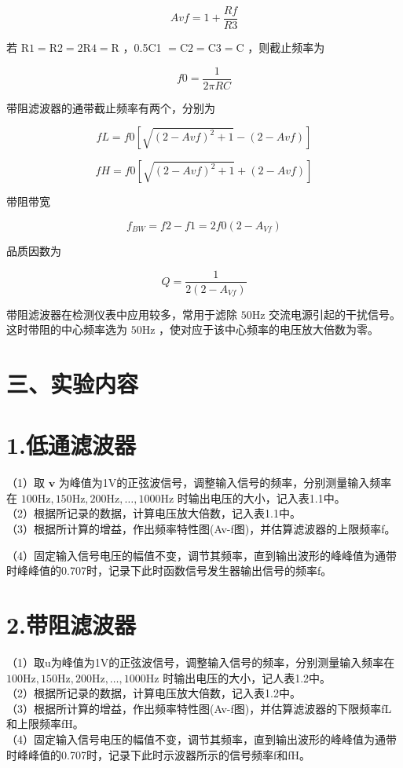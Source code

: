 \documentclass[
  10
]{article}
\begin{document}
\[
A v f = 1 + \frac {R f}{R 3}
\]

若 \(\mathrm{R1 = R2 = 2R4 = R}\) ，0.5C1
\(= \mathrm{C2} = \mathrm{C3} = \mathrm{C}\) ，则截止频率为

\[
f 0 = \frac {1}{2 \pi R C}
\]

带阻滤波器的通带截止频率有两个，分别为

\[
f L = f 0 [ \sqrt {(2 - A v f) ^ {2} + 1} - (2 - A v f) ]
\]

\[
f H = f 0 [ \sqrt {(2 - A v f) ^ {2} + 1} + (2 - A v f) ]
\]

带阻带宽

\[
f _ {B W} = f 2 - f 1 = 2 f 0 \left(2 - A _ {V f}\right)
\]

品质因数为

\[
Q = \frac {1}{2 (2 - A _ {V f})}
\]

带阻滤波器在检测仪表中应用较多，常用于滤除 \(50\mathrm{Hz}\)
交流电源引起的干扰信号。这时带阻的中心频率选为 \(50\mathrm{Hz}\)
，使对应于该中心频率的电压放大倍数为零。

\section{三、实验内容}\label{ux4e09ux5b9eux9a8cux5185ux5bb9-4}

\section{1.低通滤波器}\label{ux4f4eux901aux6ee4ux6ce2ux5668}

（1）取 \(\mathbf{v}\)
为峰值为1V的正弦波信号，调整输入信号的频率，分别测量输入频率在
\(100\mathrm{Hz},150\mathrm{Hz},200\mathrm{Hz},\dots ,1000\mathrm{Hz}\)
时输出电压的大小，记入表1.1中。\\
（2）根据所记录的数据，计算电压放大倍数，记入表1.1中。\\
（3）根据所计算的增益，作出频率特性图(Av-f图)，并估算滤波器的上限频率f。

（4）固定输入信号电压的幅值不变，调节其频率，直到输出波形的峰峰值为通带时峰峰值的0.707时，记录下此时函数信号发生器输出信号的频率f。

\section{2.带阻滤波器}\label{ux5e26ux963bux6ee4ux6ce2ux5668}

（1）取u为峰值为1V的正弦波信号，调整输入信号的频率，分别测量输入频率在
\(100\mathrm{Hz},150\mathrm{Hz},200\mathrm{Hz},\dots ,1000\mathrm{Hz}\)
时输出电压的大小，记人表1.2中。\\
（2）根据所记录的数据，计算电压放大倍数，记入表1.2中。\\
（3）根据所计算的增益，作出频率特性图(Av-f图)，并估算滤波器的下限频率fL和上限频率fH。\\
（4）固定输入信号电压的幅值不变，调节其频率，直到输出波形的峰峰值为通带时峰峰值的0.707时，记录下此时示波器所示的信号频率f和fH。
\end{document}
